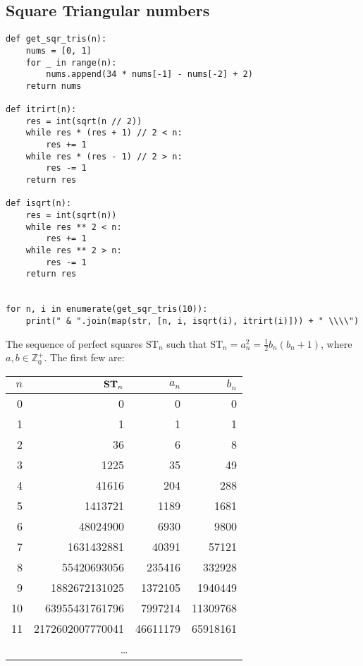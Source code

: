 \documentclass[fleqn,a4paper,11pt]{article}
\newenvironment{longlisting}
{\addvspace{\baselineskip}\captionsetup{type=listing}}
{\addvspace{\baselineskip}}
\begin{document}
    \subsection{Square Triangular numbers}


    \begin{longlisting}
    \begin{verbatim}
def get_sqr_tris(n):
    nums = [0, 1]
    for _ in range(n):
        nums.append(34 * nums[-1] - nums[-2] + 2)
    return nums

def itrirt(n):
    res = int(sqrt(n // 2))
    while res * (res + 1) // 2 < n:
        res += 1
    while res * (res - 1) // 2 > n:
        res -= 1
    return res

def isqrt(n):
    res = int(sqrt(n))
    while res ** 2 < n:
        res += 1
    while res ** 2 > n:
        res -= 1
    return res


for n, i in enumerate(get_sqr_tris(10)):
    print(" & ".join(map(str, [n, i, isqrt(i), itrirt(i)])) + " \\\\")

    \end{verbatim}
    \end{longlisting}

    The sequence of perfect squares \(\mathrm{ST}_n\) such that
    \(\mathrm{ST}_n= a_n^2 = \frac 12 b_n(b_n + 1)\), where
    \(a, b \in \mathbb{Z}_0^+\). The first few are:

    \begin{longtable}{rrrr}
    \toprule
    \boldmath\(n\) & \boldmath\(\text{\bfseries ST}_n\) & \boldmath\(a_n\) &
                   \boldmath\(b_n\) \\
    \midrule
    \endhead
    0 & 0 & 0 & 0 \\
    1 & 1 & 1 & 1 \\
    2 & 36 & 6 & 8 \\
    3 & 1225 & 35 & 49 \\
    4 & 41616 & 204 & 288 \\
    5 & 1413721 & 1189 & 1681 \\
    6 & 48024900 & 6930 & 9800 \\
    7 & 1631432881 & 40391 & 57121 \\
    8 & 55420693056 & 235416 & 332928 \\
    9 & 1882672131025 & 1372105 & 1940449 \\
    10 & 63955431761796 & 7997214 & 11309768 \\
    11 & 2172602007770041 & 46611179 & 65918161 \\
    \multicolumn{4}{c}{\ldots} \\
    \bottomrule
    \end{longtable}
\end{document}
